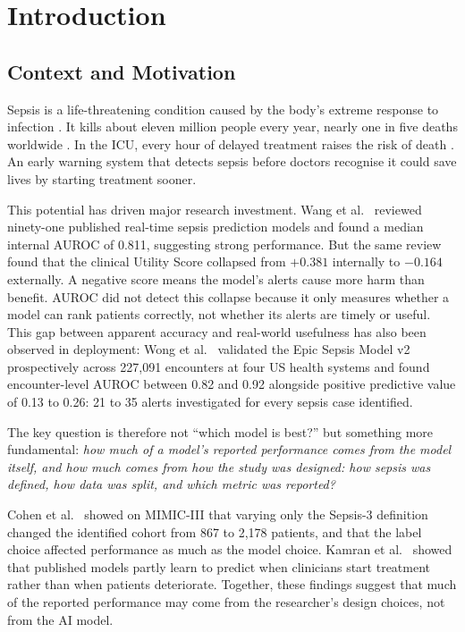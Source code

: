 \chapter{Introduction}
\label{ch:introduction}


\section{Context and Motivation}

Sepsis is a life-threatening condition caused by the body's extreme response to
infection \cite{singer2016sepsis3}. It kills about eleven million people
every year, nearly one in five deaths worldwide
\cite{rudd2020global}. In the ICU, every hour of delayed treatment raises
the risk of death \cite{seymour2017time}. An early warning system that
detects sepsis before doctors recognise it could save lives by starting
treatment sooner.

This potential has driven major research investment. Wang et al.\
\cite{wang2025srpm} reviewed ninety-one published real-time sepsis
prediction models and found a median internal AUROC of 0.811, suggesting
strong performance. But the same review found that the clinical Utility Score
collapsed from $+0.381$ internally to $-0.164$ externally. A negative score
means the model's alerts cause more harm than benefit. AUROC did not detect
this collapse because it only measures whether a model can rank patients
correctly, not whether its alerts are timely or useful. This gap between
apparent accuracy and real-world usefulness has also been observed in
deployment: Wong et al.\ \cite{wong2026epic} validated the Epic Sepsis
Model v2 prospectively across 227,091 encounters at four US health systems and
found encounter-level AUROC between 0.82 and 0.92 alongside positive predictive
value of 0.13 to 0.26: 21 to 35 alerts investigated for every sepsis case
identified.

The key question is therefore not ``which model is best?'' but something more
fundamental: \textit{how much of a model's reported performance comes from the
model itself, and how much comes from how the study was designed: how sepsis
was defined, how data was split, and which metric was reported?}

Cohen et al.\ \cite{cohen2024subtle} showed on MIMIC-III that varying only
the Sepsis-3 definition changed the identified cohort from 867 to 2,178
patients, and that the label choice affected performance as much as the model
choice. Kamran et al.\ \cite{kamran2024evaluation} showed that published
models partly learn to predict when clinicians start treatment rather than when
patients deteriorate. Together, these findings suggest that much of the reported
performance may come from the researcher's design choices, not from the AI model.

